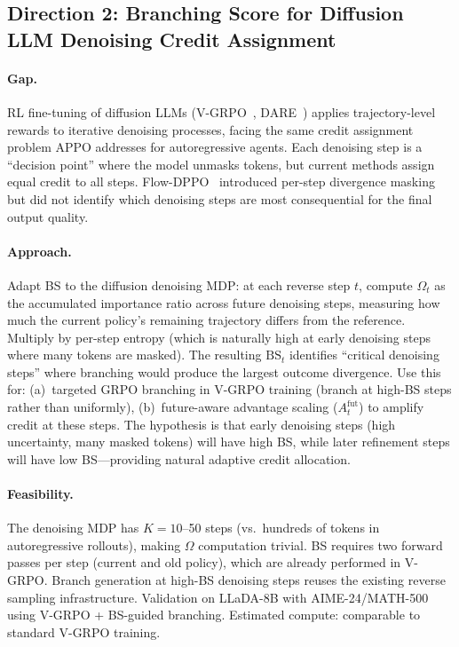 \documentclass[11pt,a4paper]{article}
\begin{document}
\subsection{Direction 2: Branching Score for Diffusion LLM Denoising Credit Assignment}

\paragraph{Gap.} RL fine-tuning of diffusion LLMs (V-GRPO~\cite{li2026vgrpo}, DARE~\cite{xu2026dare}) applies trajectory-level rewards to iterative denoising processes, facing the same credit assignment problem APPO addresses for autoregressive agents. Each denoising step is a ``decision point'' where the model unmasks tokens, but current methods assign equal credit to all steps. Flow-DPPO~\cite{ping2026flowdppo} introduced per-step divergence masking but did not identify which denoising steps are most consequential for the final output quality.

\paragraph{Approach.} Adapt BS to the diffusion denoising MDP: at each reverse step $t$, compute $\Omega_t$ as the accumulated importance ratio across future denoising steps, measuring how much the current policy's remaining trajectory differs from the reference. Multiply by per-step entropy (which is naturally high at early denoising steps where many tokens are masked). The resulting $\mathrm{BS}_t$ identifies ``critical denoising steps'' where branching would produce the largest outcome divergence. Use this for: (a)~targeted GRPO branching in V-GRPO training (branch at high-BS steps rather than uniformly), (b)~future-aware advantage scaling ($A^{\mathrm{fut}}_t$) to amplify credit at these steps. The hypothesis is that early denoising steps (high uncertainty, many masked tokens) will have high BS, while later refinement steps will have low BS---providing natural adaptive credit allocation.

\paragraph{Feasibility.} The denoising MDP has $K\!=\!10$--50 steps (vs.\ hundreds of tokens in autoregressive rollouts), making $\Omega$ computation trivial. BS requires two forward passes per step (current and old policy), which are already performed in V-GRPO. Branch generation at high-BS denoising steps reuses the existing reverse sampling infrastructure. Validation on LLaDA-8B with AIME-24/MATH-500 using V-GRPO + BS-guided branching. Estimated compute: comparable to standard V-GRPO training.
\end{document}
